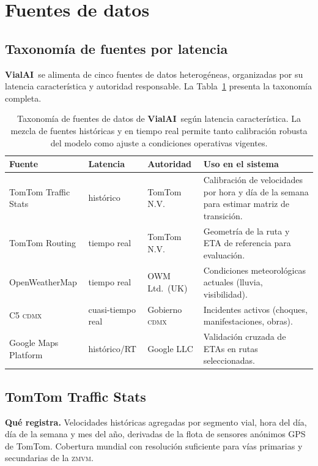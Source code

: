 \documentclass[11pt,a4paper]{article}
\newcommand{\VialAI}{\textbf{\textcolor{vialTeal}{Vial}\textcolor{vialAmber}{AI}}}
\newcommand{\ZMVM}{\textsc{zmvm}}
\newcommand{\CDMX}{\textsc{cdmx}}
\begin{document}
\section{Fuentes de datos}
\label{sec:datos}

\subsection{Taxonomía de fuentes por latencia}

\VialAI\ se alimenta de cinco fuentes de datos heterogéneas,
organizadas por su latencia característica y autoridad
responsable. La Tabla~\ref{tab:fuentes} presenta la taxonomía
completa.

\begin{table}[H]
\centering
\small
\renewcommand{\arraystretch}{1.3}
\begin{tabularx}{\linewidth}{@{}l l l X@{}}
\toprule
\rowcolor{vialNavy!10}
\textbf{Fuente} & \textbf{Latencia} & \textbf{Autoridad} &
\textbf{Uso en el sistema} \\
\midrule
TomTom Traffic Stats & histórico & TomTom N.V. &
Calibración de velocidades por hora y día de la semana para
estimar matriz de transición.\\
TomTom Routing & tiempo real & TomTom N.V. &
Geometría de la ruta y ETA de referencia para evaluación.\\
OpenWeatherMap & tiempo real & OWM Ltd.\ (UK) &
Condiciones meteorológicas actuales (lluvia, visibilidad).\\
C5 \CDMX\ & cuasi-tiempo real & Gobierno \CDMX &
Incidentes activos (choques, manifestaciones, obras).\\
Google Maps Platform & histórico/RT & Google LLC &
Validación cruzada de ETAs en rutas seleccionadas.\\
\bottomrule
\end{tabularx}
\caption{Taxonomía de fuentes de datos de \VialAI\ según latencia
característica. La mezcla de fuentes históricas y en tiempo real
permite tanto calibración robusta del modelo como ajuste a
condiciones operativas vigentes.}
\label{tab:fuentes}
\end{table}

\subsection{TomTom Traffic Stats}

\textbf{Qué registra.} Velocidades históricas agregadas por
segmento vial, hora del día, día de la semana y mes del año,
derivadas de la flota de sensores anónimos GPS de TomTom.
Cobertura mundial con resolución suficiente para vías primarias
y secundarias de la \ZMVM.
\end{document}
